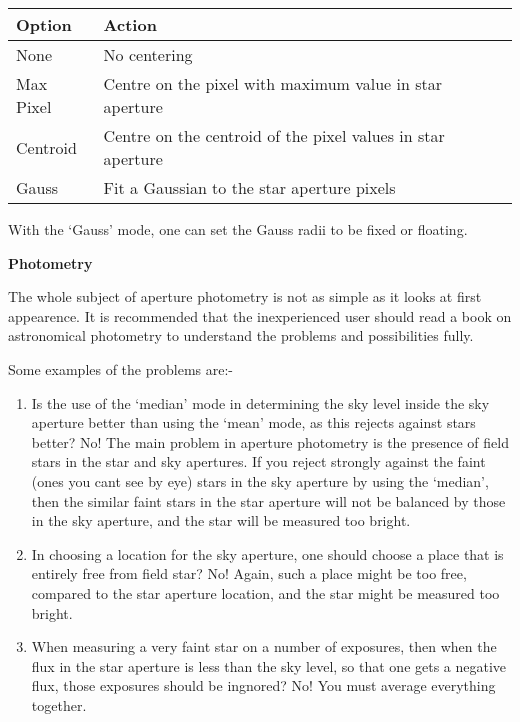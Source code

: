 \begin{small}
{{\hspace*{4ex}\begin{tabular}{|l|l|}  \hline
    Option    &  Action \\ \hline
    None      &  No centering \\
    Max Pixel &  Centre on the pixel with maximum value in star aperture \\
    Centroid  & Centre on the centroid of the pixel values in star aperture \\
    Gauss    &   Fit a Gaussian to the star aperture pixels \\ \hline
\end{tabular}

   With the `Gauss' mode, one can set the Gauss radii to be fixed or
   floating.

\vspace*{1mm}
{\bf Photometry}
\vspace*{1mm}


   The whole subject of aperture photometry is not as simple as
   it looks at first appearence. It is recommended that the
   inexperienced user should read a book on astronomical photometry
   to understand the problems and possibilities fully.

   Some examples of the problems are:-

\begin{enumerate}

\item Is the use of the `median' mode in determining the sky level
      inside the sky aperture better than using the `mean'
      mode, as this rejects against stars better? No! The main
      problem in aperture photometry is the presence of field stars
      in the star and sky apertures. If you reject strongly against
      the faint (ones you cant see by eye) stars in the sky
      aperture by using the `median', then the similar faint stars
      in the star aperture will not be balanced by those in the
      sky aperture, and the star will be measured too bright.

\item In choosing a location for the sky aperture, one should
      choose a place that is entirely free from field star? No!
      Again, such a place might be too free, compared to the star
      aperture location, and the star might be measured too bright.

\item When measuring a very faint star on a number of exposures,
      then when the flux in the star aperture is less than the
      sky level, so that one gets a negative flux, those exposures
      should be ingnored? No! You must average everything together.


\end{enumerate}}}
\end{small}
